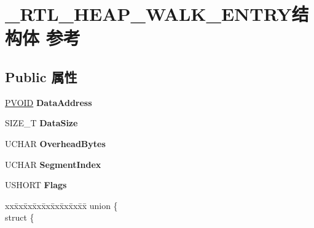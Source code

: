 \hypertarget{struct___r_t_l___h_e_a_p___w_a_l_k___e_n_t_r_y}{}\section{\+\_\+\+R\+T\+L\+\_\+\+H\+E\+A\+P\+\_\+\+W\+A\+L\+K\+\_\+\+E\+N\+T\+R\+Y结构体 参考}
\label{struct___r_t_l___h_e_a_p___w_a_l_k___e_n_t_r_y}
\subsection*{Public 属性}
\begin{DoxyCompactItemize}
\item 
\mbox{\label{struct___r_t_l___h_e_a_p___w_a_l_k___e_n_t_r_y_a47f9e48660f366b1a037611fec780034}} 
\hyperlink{interfacevoid}{P\+V\+O\+ID} {\bfseries Data\+Address}
\item 
\mbox{\label{struct___r_t_l___h_e_a_p___w_a_l_k___e_n_t_r_y_afcb8e0e236cd17eee22a598eb3dcace6}} 
S\+I\+Z\+E\+\_\+T {\bfseries Data\+Size}
\item 
\mbox{\label{struct___r_t_l___h_e_a_p___w_a_l_k___e_n_t_r_y_abeabe176d41a851ef6739d446ada8675}} 
U\+C\+H\+AR {\bfseries Overhead\+Bytes}
\item 
\mbox{\label{struct___r_t_l___h_e_a_p___w_a_l_k___e_n_t_r_y_a50176b3332a734e1bad99bf69c23c12a}} 
U\+C\+H\+AR {\bfseries Segment\+Index}
\item 
\mbox{\label{struct___r_t_l___h_e_a_p___w_a_l_k___e_n_t_r_y_ad13d362c28d51353362c545a265ea68d}} 
U\+S\+H\+O\+RT {\bfseries Flags}
\item 
\mbox{\label{struct___r_t_l___h_e_a_p___w_a_l_k___e_n_t_r_y_a74b74899c4c778ac16efbbf494dc368d}} 
\begin{tabbing}
xx\=xx\=xx\=xx\=xx\=xx\=xx\=xx\=xx\=\kill
union \{\\
\>struct \{\\

\end{tabbing}
\end{DoxyCompactItemize}
